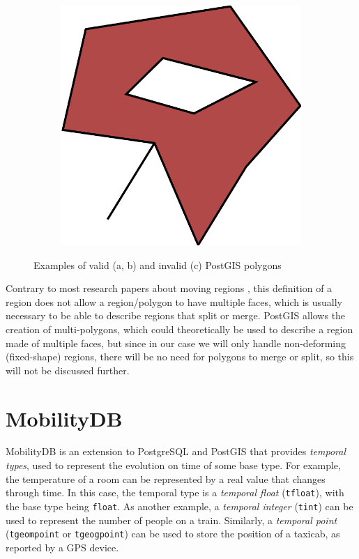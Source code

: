 \begin{figure}[h!]
\begin{subfigure}{.3\textwidth}
  \centering
  \includegraphics[width=.8\linewidth]{images/polygon_spike.pdf}
  \caption{}
  \label{fig:polygon_spike}
\end{subfigure}
\caption[Examples of valid and invalid PostGIS polygons]{Examples of valid (a, b) and invalid (c) PostGIS polygons}
\label{fig:postgis_polygon}
\end{figure}

Contrary to most research papers about moving regions \cite{polyhedra,model_structure_for_mod,moving_obj_foundation}, this definition of a region does not allow a region/polygon to have multiple faces, which is usually necessary to be able to describe regions that split or merge. PostGIS allows the creation of multi-polygons, which could theoretically be used to describe a region made of multiple faces, but since in our case we will only handle non-deforming (fixed-shape) regions, there will be no need for polygons to merge or split, so this will not be discussed further.

\section{MobilityDB}
\label{section:mobilitydb}

MobilityDB \cite{mobilitydb} is an extension to PostgreSQL and PostGIS that provides \textit{temporal types}, used to represent the evolution on time of some base type. For example, the temperature of a room can be represented by a real value that changes through time. In this case, the temporal type is a \textit{temporal float} (\lstinline{tfloat}), with the base type being \lstinline{float}. As another example, a \textit{temporal integer} (\lstinline{tint}) can be used to represent the number of people on a train. Similarly, a \textit{temporal point} (\lstinline{tgeompoint} or \lstinline{tgeogpoint}) can be used to store the position of a taxicab, as reported by a GPS device.

